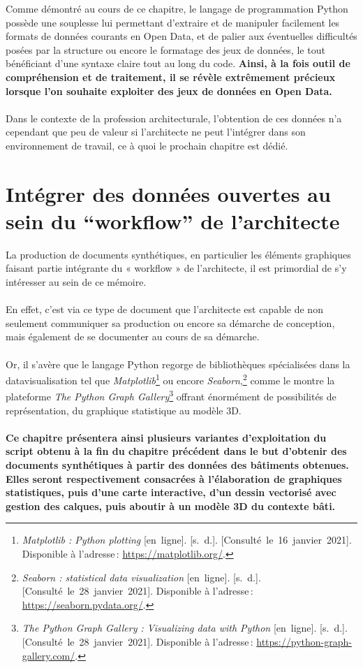 \documentclass[
  11pt,
  french,
]{article}
\begin{document}
Comme démontré au cours de ce chapitre, le langage de programmation
Python possède une souplesse lui permettant d'extraire et de manipuler
facilement les formats de données courants en Open Data, et de palier
aux éventuelles difficultés posées par la structure ou encore le
formatage des jeux de données, le tout bénéficiant d'une syntaxe claire
tout au long du code. \textbf{Ainsi, à la fois outil de compréhension et
de traitement, il se révèle extrêmement précieux lorsque l'on souhaite
exploiter des jeux de données en Open Data.}\\
~\\
Dans le contexte de la profession architecturale, l'obtention de ces
données n'a cependant que peu de valeur si l'architecte ne peut
l'intégrer dans son environnement de travail, ce à quoi le prochain
chapitre est dédié.

\newpage

\hypertarget{intuxe9grer-des-donnuxe9es-ouvertes-au-sein-du-workflow-de-larchitecte}{%
\section{Intégrer des données ouvertes au sein du ``workflow'' de
l'architecte}\label{intuxe9grer-des-donnuxe9es-ouvertes-au-sein-du-workflow-de-larchitecte}}

La production de documents synthétiques, en particulier les éléments
graphiques faisant partie intégrante du « workflow » de l'architecte, il
est primordial de s'y intéresser au sein de ce mémoire.\\
~\\
En effet, c'est via ce type de document que l'architecte est capable de
non seulement communiquer sa production ou encore sa démarche de
conception, mais également de se documenter au cours de sa démarche.\\
~\\
Or, il s'avère que le langage Python regorge de bibliothèques
spécialisées dans la datavisualisation tel que
\emph{Matplotlib}\footnote{\emph{Matplotlib : Python plotting}
  {[}en~ligne{]}. {[}s.~d.{]}. {[}Consulté~le~16~janvier~2021{]}.
  Disponible à l'adresse\,: \url{https://matplotlib.org/}.} ou encore
\emph{Seaborn},\footnote{\emph{Seaborn : statistical data visualization}
  {[}en~ligne{]}. {[}s.~d.{]}. {[}Consulté~le~28~janvier~2021{]}.
  Disponible à l'adresse\,: \url{https://seaborn.pydata.org/}.} comme le
montre la plateforme \emph{The Python Graph Gallery}\footnote{\emph{The
  Python Graph Gallery : Visualizing data with Python} {[}en~ligne{]}.
  {[}s.~d.{]}. {[}Consulté~le~28~janvier~2021{]}. Disponible à
  l'adresse\,: \url{https://python-graph-gallery.com/}.} offrant
énormément de possibilités de représentation, du graphique statistique
au modèle 3D.\\
~\\
\textbf{Ce chapitre présentera ainsi plusieurs variantes d'exploitation
du script obtenu à la fin du chapitre précédent dans le but d'obtenir
des documents synthétiques à partir des données des bâtiments obtenues.
Elles seront respectivement consacrées à l'élaboration de graphiques
statistiques, puis d'une carte interactive, d'un dessin vectorisé avec
gestion des calques, puis aboutir à un modèle 3D du contexte bâti.}
\end{document}
